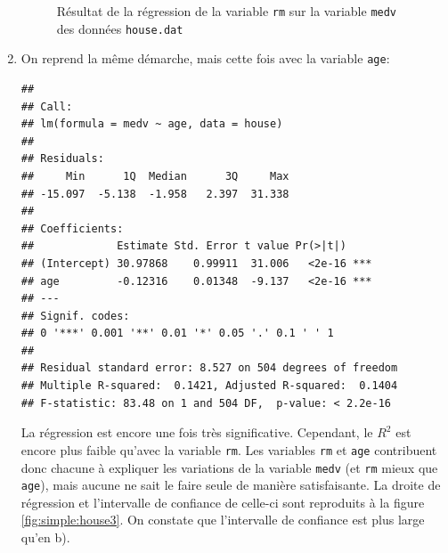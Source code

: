 \begin{solution}{2.17}
\begin{enumerate}
\begin{figure}
\begin{knitrout}
\end{knitrout}
        \caption{Résultat de la régression de la variable \texttt{rm} sur la variable \texttt{medv} des données \texttt{house.dat}}
        \label{fig:simple:house2}
      \end{figure}
    \item On reprend la même démarche, mais cette fois avec la
      variable \texttt{age}:
\begin{knitrout}
\color{fgcolor}\begin{kframe}
\begin{alltt}
 \hlkwb{<-}  \hlopt{~}   
\end{alltt}
\begin{verbatim}
##
## Call:
## lm(formula = medv ~ age, data = house)
##
## Residuals:
##     Min      1Q  Median      3Q     Max
## -15.097  -5.138  -1.958   2.397  31.338
##
## Coefficients:
##             Estimate Std. Error t value Pr(>|t|)
## (Intercept) 30.97868    0.99911  31.006   <2e-16 ***
## age         -0.12316    0.01348  -9.137   <2e-16 ***
## ---
## Signif. codes:
## 0 '***' 0.001 '**' 0.01 '*' 0.05 '.' 0.1 ' ' 1
##
## Residual standard error: 8.527 on 504 degrees of freedom
## Multiple R-squared:  0.1421,	Adjusted R-squared:  0.1404
## F-statistic: 83.48 on 1 and 504 DF,  p-value: < 2.2e-16
\end{verbatim}
\begin{alltt}
 \hlkwb{<-}   \hlstd{=} \hlstd{,}  \hlstd{=} \hlstd{)}
\end{alltt}
\end{kframe}
\end{knitrout}
      La régression est encore une fois très significative. Cependant,
      le $R^2$ est encore plus faible qu'avec la variable
      \texttt{rm}. Les variables \texttt{rm} et \texttt{age}
      contribuent donc chacune à expliquer les variations de la
      variable \texttt{medv} (et \texttt{rm} mieux que \texttt{age}),
      mais aucune ne sait le faire seule de manière satisfaisante. La
      droite de régression et l'intervalle de confiance de celle-ci
      sont reproduits à la figure \ref{fig:simple:house3}. On constate
      que l'intervalle de confiance est plus large qu'en b).
      \begin{figure}
        \centering
\begin{knitrout}

\end{knitrout}
\end{figure}
\end{enumerate}
\end{solution}
